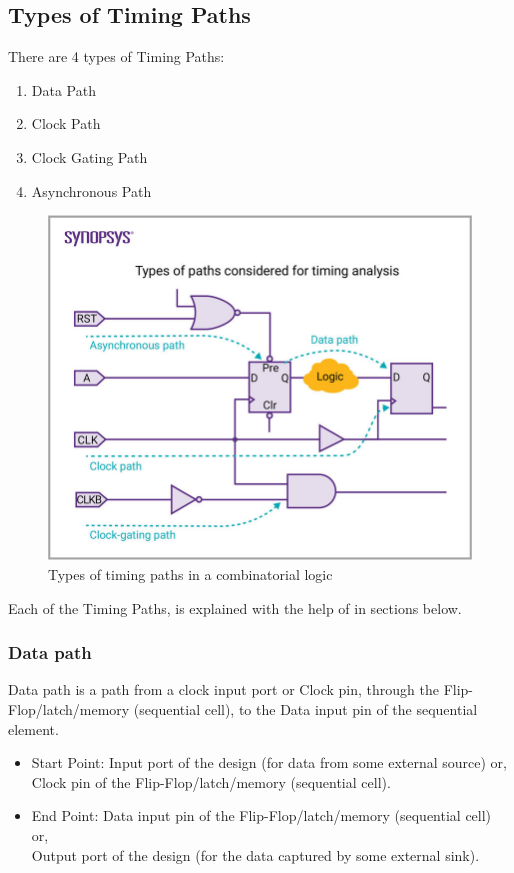 \subsection{Types of Timing Paths}
There are 4 types of Timing Paths:
\begin{enumerate}
    \item Data Path
    \item Clock Path
    \item Clock Gating Path
    \item Asynchronous Path 
\end{enumerate}

\begin{figure}[H]
\begin{center}
\includegraphics[width=4.5in]{images/STAPathTypes.jpg}
\caption{Types of timing paths in a combinatorial logic}
\label{STAPathTypes}
\end{center}
\end{figure}

Each of the Timing Paths, is explained with the help of  in sections below.

\subsubsection{Data path}
Data path is a path from a clock input port or Clock pin, through the Flip-Flop/latch/memory (sequential cell), to the Data input pin of the sequential element.

\begin{itemize}
    \item Start Point: Input port of the design (for data from some external source) or,\\ Clock pin of the Flip-Flop/latch/memory (sequential cell).
    \item End Point: Data input pin of the Flip-Flop/latch/memory (sequential cell) or, \\ Output port of the design (for the data captured by some external sink).
\end{itemize}

